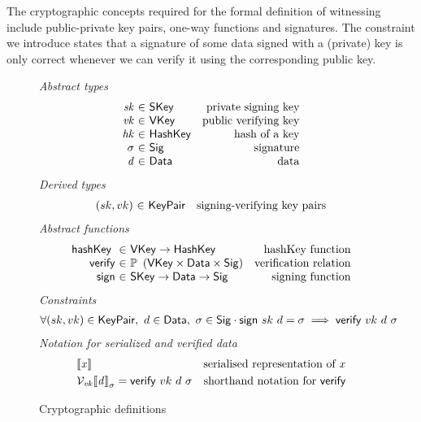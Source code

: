 \documentclass[11pt,a4paper,dvipsnames]{article}
\newcommand{\VKey}{\type{VKey}}
\newcommand{\SKey}{\type{SKey}}
\newcommand{\HashKey}{\type{HashKey}}
\newcommand{\KeyPair}{\type{KeyPair}}
\newcommand{\Sig}{\type{Sig}}
\newcommand{\Data}{\type{Data}}
\newcommand{\verify}[3]{\fun{verify} ~ #1 ~ #2 ~ #3}
\newcommand{\sign}[2]{\fun{sign} ~ #1 ~ #2}
\newcommand{\serialised}[1]{\llbracket \var{#1} \rrbracket}
\newcommand{\hashKey}[1]{\fun{hashKey}~ \var{#1}}
\theoremstyle{definition}
\theoremstyle{definition}
\begin{document}
The cryptographic concepts required for the formal definition
of witnessing include public-private key pairs, one-way functions
and signatures. The constraint we introduce states that a signature of
some data signed with a (private) key is only correct whenever we can verify
it using the corresponding public key.

\begin{figure}
  \emph{Abstract types}
  \begin{equation*}
    \begin{array}{r@{~\in~}lr}
      \var{sk} & \SKey & \text{private signing key}\\
      \var{vk} & \VKey & \text{public verifying key}\\
      \var{hk} & \HashKey & \text{hash of a key}\\
      \sigma & \Sig  & \text{signature}\\
      \var{d} & \Data  & \text{data}\\
    \end{array}
  \end{equation*}
  \emph{Derived types}
  \begin{equation*}
    \begin{array}{r@{~\in~}lr}
      (sk, vk) & \KeyPair & \text{signing-verifying key pairs}
    \end{array}
  \end{equation*}
  \emph{Abstract functions}
  \begin{equation*}
    \begin{array}{r@{~\in~}lr}
      \hashKey{} & \VKey \to \HashKey
                 & \text{hashKey function} \\
      \fun{verify} & \powerset{\left(\VKey \times \Data \times \Sig\right)}
                   & \text{verification relation}\\
      \fun{sign} & \SKey \to \Data \to \Sig
                 & \text{signing function}\\
    \end{array}
  \end{equation*}
  \emph{Constraints}
  \begin{align*}
    & \forall (sk, vk) \in \KeyPair,~ d \in \Data,~ \sigma \in \Sig \cdot
    \sign{sk}{d} = \sigma \implies \verify{vk}{d}{\sigma}
  \end{align*}
  \emph{Notation for serialized and verified data}
  \begin{align*}
    & \serialised{x} & \text{serialised representation of } x\\
    & \mathcal{V}_{\var{vk}}{\serialised{d}}_{\sigma} = \verify{vk}{d}{\sigma}
    & \text{shorthand notation for } \fun{verify}
  \end{align*}
  \caption{Cryptographic definitions}
  \label{fig:crypto-defs}
\end{figure}
\end{document}
